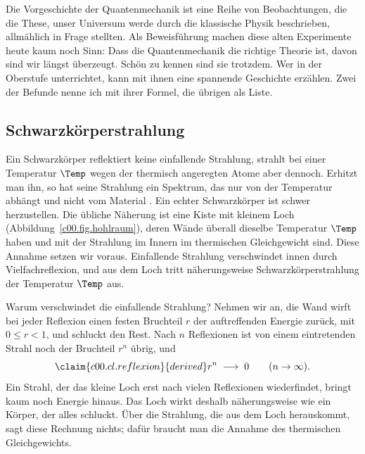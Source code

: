 Die Vorgeschichte der Quantenmechanik ist eine Reihe von Beobachtungen, die die These, unser
Universum werde durch die klassische Physik beschrieben, allmählich in Frage stellten. Als
Beweisführung machen diese alten Experimente heute kaum noch Sinn: Dass die Quantenmechanik
die richtige Theorie ist, davon sind wir längst überzeugt. Schön zu kennen sind sie trotzdem.
Wer in der Oberstufe unterrichtet, kann mit ihnen eine spannende Geschichte erzählen. Zwei
der Befunde nenne ich mit ihrer Formel, die übrigen als Liste.

\subsection{Schwarzkörperstrahlung}\label{c00.s4.1}

Ein Schwarzkörper reflektiert keine einfallende Strahlung, strahlt bei einer Temperatur
$\Temp$ wegen der thermisch angeregten Atome aber dennoch. Erhitzt man ihn, so hat seine
Strahlung ein Spektrum, das nur von der Temperatur abhängt und nicht vom Material
. Ein echter Schwarzkörper ist schwer
herzustellen. Die übliche Näherung ist eine Kiste mit kleinem Loch
(Abbildung~\ref{c00.fig.hohlraum}), deren Wände überall dieselbe Temperatur $\Temp$ haben und
mit der Strahlung im Innern im thermischen Gleichgewicht sind. Diese Annahme setzen wir
voraus. Einfallende Strahlung verschwindet innen durch Vielfachreflexion, und aus dem Loch
tritt näherungsweise Schwarzkörperstrahlung der Temperatur $\Temp$ aus.

Warum verschwindet die einfallende Strahlung? Nehmen wir an, die Wand wirft bei jeder Reflexion einen
festen Bruchteil $r$ der auftreffenden Energie zurück, mit $0 \leq r < 1$, und schluckt den
Rest. Nach $n$ Reflexionen ist von einem eintretenden Strahl noch der Bruchteil $r^n$
übrig, und
\begin{equation}\label{c00.eq.reflexion}\claim{c00.cl.reflexion}{derived}
  r^n \;\longrightarrow\; 0
  \qquad (n \to \infty) .
\end{equation}
Ein Strahl, der das kleine Loch erst nach vielen Reflexionen wiederfindet, bringt
kaum noch Energie hinaus. Das Loch wirkt deshalb näherungsweise wie ein Körper, der alles
schluckt. Über die Strahlung, die aus dem Loch herauskommt, sagt diese Rechnung nichts; dafür
braucht man die Annahme des thermischen Gleichgewichts.

